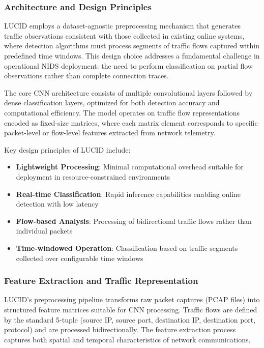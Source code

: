 \subsubsection{Architecture and Design Principles}

LUCID employs a dataset-agnostic preprocessing mechanism that generates traffic observations consistent with those collected in existing online systems, where detection algorithms must process segments of traffic flows captured within predefined time windows. This design choice addresses a fundamental challenge in operational NIDS deployment: the need to perform classification on partial flow observations rather than complete connection traces.

The core CNN architecture consists of multiple convolutional layers followed by dense classification layers, optimized for both detection accuracy and computational efficiency. The model operates on traffic flow representations encoded as fixed-size matrices, where each matrix element corresponds to specific packet-level or flow-level features extracted from network telemetry.

Key design principles of LUCID include:
\begin{itemize}
\item \textbf{Lightweight Processing}: Minimal computational overhead suitable for deployment in resource-constrained environments
\item \textbf{Real-time Classification}: Rapid inference capabilities enabling online detection with low latency
\item \textbf{Flow-based Analysis}: Processing of bidirectional traffic flows rather than individual packets
\item \textbf{Time-windowed Operation}: Classification based on traffic segments collected over configurable time windows
\end{itemize}

\subsubsection{Feature Extraction and Traffic Representation}

LUCID's preprocessing pipeline transforms raw packet captures (PCAP files) into structured feature matrices suitable for CNN processing. Traffic flows are defined by the standard 5-tuple (source IP, source port, destination IP, destination port, protocol) and are processed bidirectionally. The feature extraction process captures both spatial and temporal characteristics of network communications.

